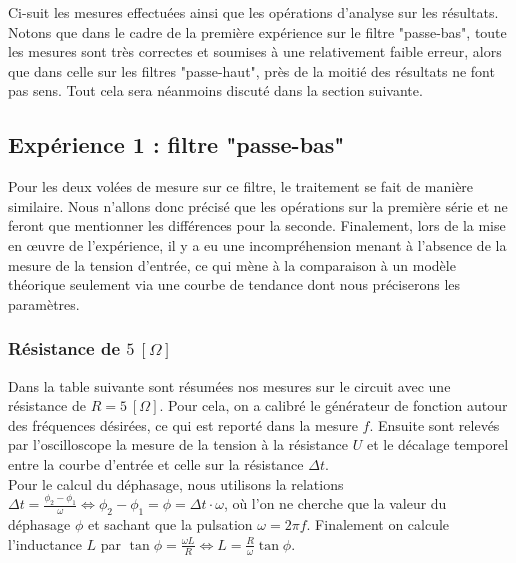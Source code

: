 Ci-suit les mesures effectuées ainsi que les opérations d'analyse sur les résultats. Notons que dans le cadre de la première expérience sur le filtre "passe-bas", toute les mesures sont très correctes et soumises à une relativement faible erreur, alors que dans celle sur les filtres "passe-haut", près de la moitié des résultats ne font pas sens. Tout cela sera néanmoins discuté dans la section suivante. 

\subsection{Expérience 1 : filtre "passe-bas"}

Pour les deux volées de mesure sur ce filtre, le traitement se fait de manière similaire. Nous n'allons donc précisé que les opérations sur la première série et ne feront que mentionner les différences pour la seconde. Finalement, lors de la mise en œuvre de l'expérience, il y a eu une incompréhension menant à l'absence de la mesure de la tension d'entrée, ce qui mène à la comparaison à un modèle théorique seulement via une courbe de tendance dont nous préciserons les paramètres.

\subsubsection{Résistance de \texorpdfstring{$ 5 \ [ \Omega ] $}{TEXT}}

Dans la table suivante sont résumées nos mesures sur le circuit avec une résistance de $R = 5 \ [\Omega]$. Pour cela, on a calibré le générateur de fonction autour des fréquences désirées, ce qui est reporté dans la mesure $f$. Ensuite sont relevés par l'oscilloscope la mesure de la tension à la résistance $U$ et le décalage temporel entre la courbe d'entrée et celle sur la résistance $\Delta t$.\\
Pour le calcul du déphasage, nous utilisons la relations $\Delta t = \frac{\phi_2 - \phi_1}{\omega} \Leftrightarrow \phi_2 - \phi_1 = \phi = \Delta t \cdot \omega$, où l'on ne cherche que la valeur du déphasage $\phi$ et sachant que la pulsation $\omega = 2 \pi f$. Finalement on calcule l'inductance $L$ par $\tan \phi = \frac{\omega L}{R} \Leftrightarrow L = \frac{R}{\omega} \tan \phi$.


